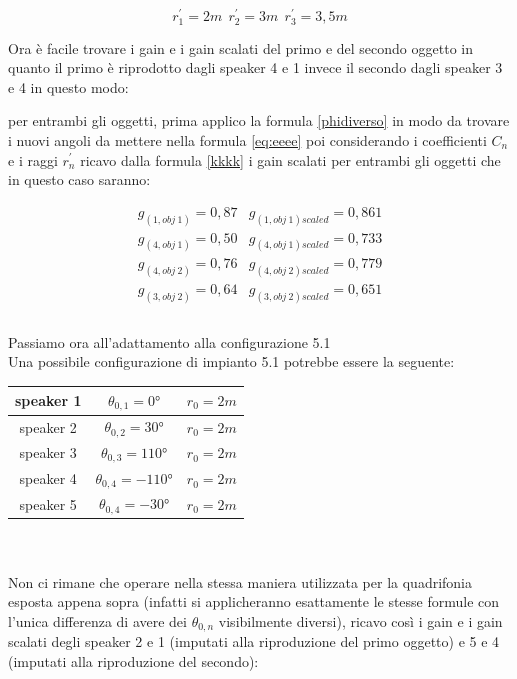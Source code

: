 \documentclass[12pt,a4paper]{report}
\begin{document}
\[r_1^{\prime}=2m \ \  r_2^{\prime}=3m \ \ r_3^{\prime}=3,5m  \]

Ora è facile trovare i gain e i gain scalati del primo e del secondo oggetto in quanto il primo è riprodotto dagli speaker 4 e 1 invece il secondo dagli speaker 3 e 4 in questo modo:

per entrambi gli oggetti, prima applico la formula \ref{phidiverso} in modo da trovare i nuovi angoli da mettere nella formula \ref{eq:eeee} poi considerando i coefficienti $C_n$ e i raggi $r_n^{\prime}$ ricavo dalla formula \ref{kkkk} i gain scalati per entrambi gli oggetti che in questo caso saranno:

\begin{equation}
\begin{matrix}
g_{(1,obj\ 1)} = 0,87 & g_{(1,obj\ 1)scaled} = 0,861\\
g_{(4,obj\ 1)} = 0,50 & g_{(4,obj\ 1)scaled} = 0,733\\
g_{(4,obj\ 2)} = 0,76 & g_{(4,obj\ 2)scaled} = 0,779\\
g_{(3,obj\ 2)} = 0,64 & g_{(3,obj\ 2)scaled} = 0,651\\
\end{matrix}
\label{gscalatiesempio1}
\end{equation}
\\

Passiamo ora all'adattamento alla configurazione 5.1\\

Una possibile configurazione di impianto 5.1 potrebbe essere la seguente:\\

\begin{tabular}{|c|c|c|}
\hline
speaker 1 & $\theta_{0,1}=0°$ & $r_0=2m$\\
\hline
speaker 2 & $\theta_{0,2}=30°$ & $r_0=2m$\\
\hline
speaker 3 & $\theta_{0,3}=110°$ & $r_0=2m$\\
\hline
speaker 4 & $\theta_{0,4}=-110°$ & $r_0=2m$\\
\hline
speaker 5 & $\theta_{0,4}=-30°$ & $r_0=2m$\\
\hline
\end{tabular} \\
\\

Non ci rimane che operare nella stessa maniera utilizzata per la quadrifonia esposta appena sopra (infatti si applicheranno esattamente le stesse formule con l'unica differenza di avere dei $\theta_{0,n}$ visibilmente diversi), ricavo così i gain e i gain scalati degli speaker 2 e 1 (imputati alla riproduzione del primo oggetto) e 5 e 4 (imputati alla riproduzione del secondo):\\
\end{document}
